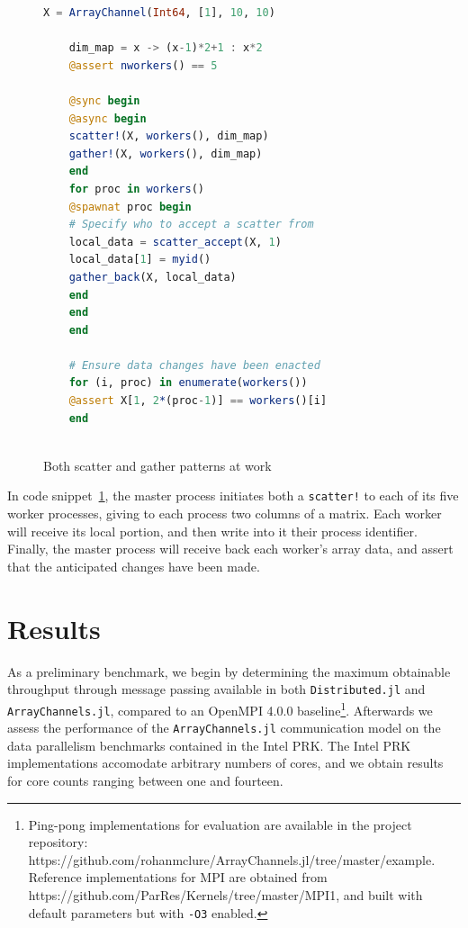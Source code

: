 \documentclass{juliacon}
\begin{document}
\begin{figure}[htb]
	\begin{lstlisting}[language=Julia]
	X = ArrayChannel(Int64, [1], 10, 10)
	
	dim_map = x -> (x-1)*2+1 : x*2
	@assert nworkers() == 5
	
	@sync begin
	@async begin
	scatter!(X, workers(), dim_map)
	gather!(X, workers(), dim_map)
	end
	for proc in workers()
	@spawnat proc begin
	# Specify who to accept a scatter from
	local_data = scatter_accept(X, 1) 
	local_data[1] = myid()
	gather_back(X, local_data)
	end
	end
	end
	
	# Ensure data changes have been enacted
	for (i, proc) in enumerate(workers())
	@assert X[1, 2*(proc-1)] == workers()[i]
	end
	
	\end{lstlisting}
	\caption{Both scatter and gather patterns at work}
	\label{code:scatter-gather}
\end{figure}

In code snippet~\ref{code:scatter-gather}, the master process initiates both a \texttt{scatter!} to each of its five worker processes, giving to each process two columns of a matrix. Each worker will receive its local portion, and then write into it their process identifier. Finally, the master process will receive back each worker's array data, and assert that the anticipated changes have been made.


\section{Results}
\label{sec:results}

As a preliminary benchmark, we begin by determining the maximum
obtainable throughput through message passing available in both
\texttt{Distributed.jl} and \texttt{ArrayChannels.jl}, compared to an
OpenMPI 4.0.0 baseline\footnote{Ping-pong implementations for evaluation
	are available in the project repository:
	https://github.com/rohanmclure/ArrayChannels.jl/tree/master/example.
	Reference implementations for MPI are obtained from
	https://github.com/ParRes/Kernels/tree/master/MPI1, and built with
	default parameters but with \texttt{-O3} enabled.}. Afterwards we
assess the performance of the \texttt{ArrayChannels.jl} communication
model on the data parallelism benchmarks contained in the Intel PRK. The
Intel PRK implementations accomodate arbitrary numbers of cores, and we
obtain results for core counts ranging between one and fourteen.
\end{document}
